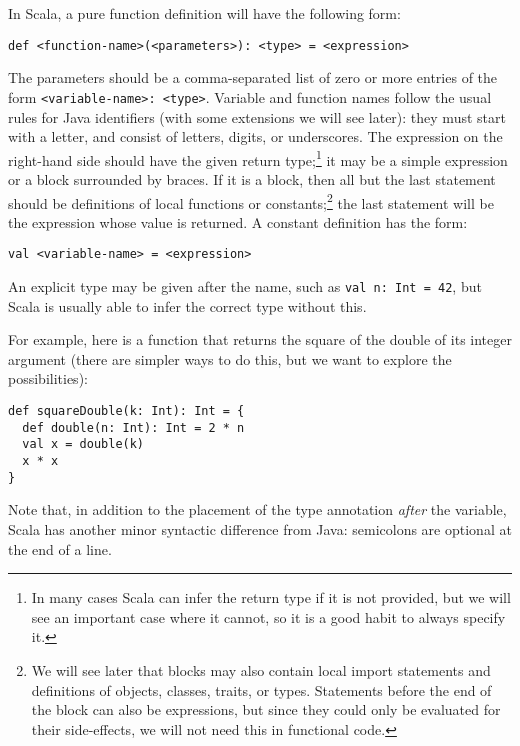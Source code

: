 In Scala, a pure function definition will have the following form:
\begin{verbatim}
def <function-name>(<parameters>): <type> = <expression>
\end{verbatim}
The parameters should be a comma-separated list of zero or more entries of the form \verb|<variable-name>: <type>|. Variable and function names follow the usual rules for Java identifiers (with some extensions we will see later): they must start with a letter, and consist of letters, digits, or underscores. The expression on the right-hand side should have the given return type;\footnote{In many cases Scala can infer the return type if it is not provided, but we will see an important case where it cannot, so it is a good habit to always specify it.} it may be a simple expression or a block surrounded by braces. If it is a block, then all but the last statement should be definitions of local functions or constants;\footnote{We will see later that blocks may also contain local import statements and definitions of objects, classes, traits, or types. Statements before the end of the block can also be expressions, but since they could only be evaluated for their side-effects, we will not need this in functional code.} the last statement will be the expression whose value is returned. A constant definition has the form:
\begin{verbatim}
val <variable-name> = <expression>
\end{verbatim}
An explicit type may be given after the name, such as \verb|val n: Int = 42|, but Scala is usually able to infer the correct type without this.

For example, here is a function that returns the square of the double of its integer argument (there are simpler ways to do this, but we want to explore the possibilities):
\begin{verbatim}
def squareDouble(k: Int): Int = {
  def double(n: Int): Int = 2 * n
  val x = double(k)
  x * x
}
\end{verbatim}
Note that, in addition to the placement of the type annotation \emph{after} the variable, Scala has another minor syntactic difference from Java: semicolons are optional at the end of a line.

